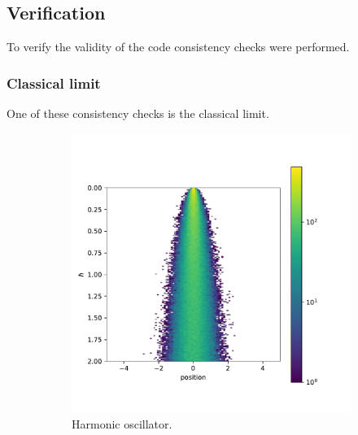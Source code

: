 \documentclass{scrartcl}
\begin{document}
	\subsection{Verification}
		\label{sec:verification}
		To verify the validity of the code consistency checks were performed.

	\subsubsection{Classical limit}
		One of these consistency checks is the classical limit.
		\begin{figure}[H]
			\centering
			\begin{subfigure}[c]{0.49\textwidth}
				\includegraphics[width=\textwidth]{../imgs/harmonic_oscillator_classical_limit/harmonic_oscillator_10_classical_limit.pdf}
				\caption{Harmonic oscillator.}
				\label{fig:harmonic_oscillator_classical_limit}
			\end{subfigure}
			\begin{subfigure}[c]{0.49\textwidth}

\end{subfigure}
\end{figure}
\end{document}
